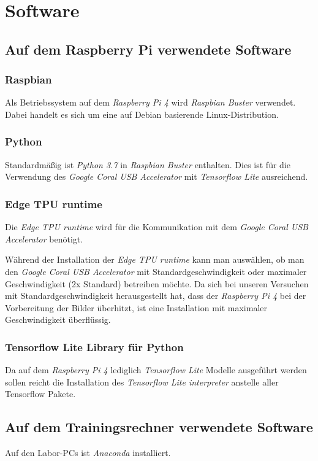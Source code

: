 \documentclass[a4paper, 12pt]{scrartcl}
\begin{document}
	\section{Software}
		\subsection{Auf dem Raspberry Pi verwendete Software}
			\subsubsection{Raspbian}
			Als Betriebssystem auf dem \emph{Raspberry Pi 4} wird \emph{Raspbian Buster} verwendet. Dabei handelt es sich um eine auf Debian basierende Linux-Distribution.
			
			
			\subsubsection{Python}
			Standardmäßig ist \emph{Python 3.7} in \emph{Raspbian Buster} enthalten. Dies ist für die Verwendung des \emph{Google Coral USB Accelerator} mit \emph{Tensorflow Lite} ausreichend.
			
			\subsubsection{Edge TPU runtime}
			Die \emph{Edge TPU runtime} wird für die Kommunikation mit dem \emph{Google Coral USB Accelerator} benötigt.
			
			Während der Installation der \emph{Edge TPU runtime} kann man auswählen, ob man den \emph{Google Coral USB Accelerator} mit Standardgeschwindigkeit oder maximaler Geschwindigkeit (2x Standard) betreiben möchte. Da sich bei unseren Versuchen mit Standardgeschwindigkeit herausgestellt hat, dass der \emph{Raspberry Pi 4} bei der Vorbereitung der Bilder überhitzt, ist eine Installation mit maximaler Geschwindigkeit überflüssig.
			
			\subsubsection{Tensorflow Lite Library für Python}
			Da auf dem \emph{Raspberry Pi 4} lediglich \emph{Tensorflow Lite} Modelle ausgeführt werden sollen reicht die Installation des \emph{Tensorflow Lite interpreter} anstelle aller Tensorflow Pakete.
			
				
		
		\subsection{Auf dem Trainingsrechner verwendete Software}
		Auf den Labor-PCs ist \emph{Anaconda} installiert.
\end{document}

